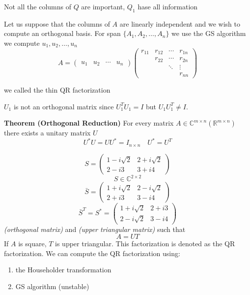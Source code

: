 Not all the columns of $Q$ are important, $Q_1$ hase all information

Let us suppose that the columns of $A$ are linearly independent and we wish to compute an orthogonal basis.
For span $\{A_1, A_2, \ldots, A_n\}$ we use the GS algorithm we compute $u_1, u_2, \ldots, u_n$
\[
A = \begin{pmatrix}
    u_1 & u_2 & \cdots & u_n
\end{pmatrix}
\begin{pmatrix}
    r_{11} & r_{12} & \cdots & r_{1n} \\
    & r_{22} & \cdots & r_{2n} \\
    & & \ddots & \vdots \\
    & & & r_{nn}
\end{pmatrix}
\]

we called the thin QR factorization

$U_1$ is not an orthogonal matrix since $U_1^T U_1 = I$ but $U_1 U_1^T \neq I$.


\textbf{Theorem (Orthogonal Reduction)} For every matrix $A \in \mathbb{C}^{m \times n} (\mathbb{R}^{m \times n})$ there exists a unitary matrix $U$
\[
U^*U = UU^* = I_{n \times n} \quad U^* = U^T
\]

\begin{equation*}
S = \begin{pmatrix}
1 - i\sqrt{2} & 2+i\sqrt{2} \\
2 - i3 & 3+i4
\end{pmatrix}
\end{equation*}
\begin{equation*}
S \in \mathbb{C}^{2 \times 2}
\end{equation*}
\begin{equation*}
\bar{S} = \begin{pmatrix}
1+i\sqrt{2} & 2-i\sqrt{2} \\
2+i3 & 3-i4
\end{pmatrix}
\end{equation*}
\begin{equation*}
\bar{S}^T = S^* = \begin{pmatrix}
1+i\sqrt{2} & 2+i3 \\
2-i\sqrt{2} & 3-i4
\end{pmatrix}
\end{equation*}
\textit{(orthogonal matrix)} and \textit{(upper triangular matrix)} such that
\begin{equation*}
A = U T
\end{equation*}
If $A$ is square, $T$ is upper triangular. This factorization is denoted as the QR factorization. We can compute the QR factorization using:
\begin{enumerate}
\item the Householder transformation
\item GS algorithm (unstable)
\end{enumerate}


